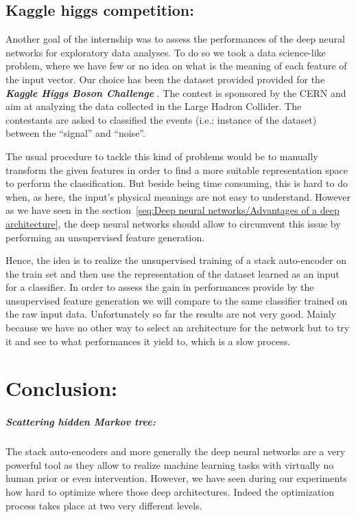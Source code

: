 \documentclass[a4paper,11pt]{report}
\newcommand{\Important}[1]{\textbf{{\em #1}}}
\begin{document}
		
	\section{Kaggle higgs competition:}
		\label{seq:Experimental results/kaggle:}
		
		Another goal of the internship was to assess the performances of the deep neural networks for exploratory data analyses. To do so we took a data science-like problem, where we have few or no idea on what is the meaning of each feature of the input vector. Our choice has been the dataset provided provided for the \Important{Kaggle Higgs Boson Challenge} \cite{Kaggle_higgs}. The contest is sponsored by the CERN and aim at analyzing the data collected in the Large Hadron Collider. The contestants are asked to classified the events (i.e.: instance of the dataset) between the ``signal'' and ``noise''.\\\par
		
		The usual procedure to tackle this kind of problems would be to manually transform the given features in order to find a more suitable representation space to perform the classification. But beside being time consuming, this is hard to do when, as here, the input's physical meanings are not easy to understand. However as we have seen in the section~\ref{seq:Deep neural networks/Advantages of a deep architecture}, the deep neural networks should allow to circumvent this issue by performing an unsupervised feature generation.\\\par

		Hence, the idea is to realize the unsupervised training of a stack auto-encoder on the train set and then use the representation of the dataset learned as an input for a classifier. In order to assess the gain in performances provide by the unsupervised feature generation we will compare to the same classifier trained on the raw input data. Unfortunately so far the results are not very good. Mainly because we have no other way to select an architecture for the network but to try it  and see to what performances it yield to, which is a slow process.		

\chapter{Conclusion:}
  \paragraph{Scattering hidden Markov tree:}
    The stack auto-encoders and more generally the deep neural networks are a very powerful tool as they allow to realize machine learning tasks with virtually no human prior or even intervention. However, we have seen during our experiments how hard to optimize where those deep architectures. Indeed the optimization process takes place at two very different levels.\\\par
    
\end{document}
